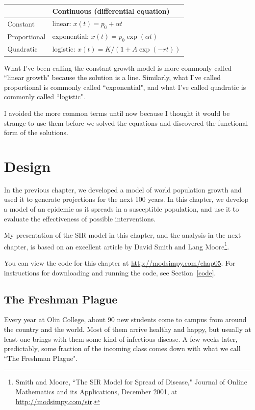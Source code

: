 \documentclass[12pt]{book}
\theoremstyle{exercise}
\begin{document}
\begin{tabular}{l|l} 
\hline
        & Continuous (differential equation) \\ 
\hline 
Constant & linear: $x(t) = p_0 + \alpha t$ \\ 
 
Proportional & exponential: $x(t) = p_0 \exp(\alpha t)$ \\ 
 
Quadratic & logistic: $x(t) = K / (1 + A\exp(-rt))$ \\ 
\end{tabular} 

What I've been calling the constant growth model is more commonly called ``linear growth" because the solution is a line.  Similarly, what I've called proportional is commonly called ``exponential", and what I've called quadratic is commonly called ``logistic".

I avoided the more common terms until now because I thought it would be strange to use them before we solved the equations and discovered the functional form of the solutions.


\chapter{Design}

In the previous chapter, we developed a model of world population growth and used it to generate projections for the next 100 years.  In this chapter, we develop a model of an epidemic as it spreads in a susceptible population, and use it to evaluate the effectiveness of possible interventions.

My presentation of the SIR model in this chapter, and the analysis in the next chapter, is based on an excellent article by David Smith and Lang Moore\footnote{Smith and Moore, ``The SIR Model for Spread of Disease," Journal of Online Mathematics and its Applications, December 2001, at \url{http://modsimpy.com/sir}.}.

You can view the code for this chapter at \url{http://modsimpy.com/chap05}.  For instructions for downloading and running the code, see Section~\ref{code}.


\section{The Freshman Plague}

Every year at Olin College, about 90 new students come to campus from around the country and the world.  Most of them arrive healthy and happy, but usually at least one brings with them some kind of infectious disease.  A few weeks later, predictably, some fraction of the incoming class comes down with what we call ``The Freshman Plague".
\end{document}
